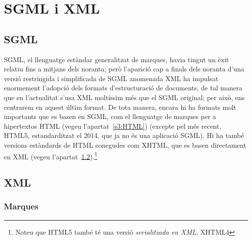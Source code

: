 \section{SGML i XML}
\label{s3:SGML}
\label{ss:SGML}

\subsection{SGML}

SGML, el llenguatge estàndar generalitzat de marques, havia tingut un
èxit relatiu fins a mitjans dels noranta; però l'aparició cap a finals
dels noranta d'una versió restringida i simplificada de SGML anomenada
XML ha impulsat enormement l'adopció dels formats d'estructuració de
documents, de tal manera que en l'actualitat s'usa XML moltíssim més
que el SGML original; per això, ens centrarem en aquest últim
format. De tota manera, encara hi ha formats molt importants que es
basen en SGML, com el llenguatge de marques per a hipertextos HTML (vegeu l'apartat~\ref{s3:HTML})
(excepte pel més recent, HTML5, estandarditzat el 2014, que ja no és
una aplicació SGML). Hi ha també versions estàndards de HTML conegudes
com XHTML, que es basen directament en XML (vegeu l'apartat~\ref{s3:XML}).\footnote{Noteu que
  HTML5 també té una versió \emph{serialitzada en XML}, XHTML4}

\subsection{XML}
\label{s3:XML}

\subsubsection{Marques}


